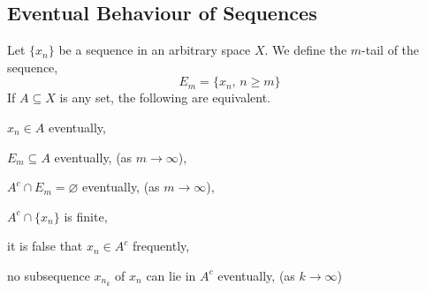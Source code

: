 \documentclass[../../main.tex]{subfiles}
\begin{document}
\providecommand{\xn}{\{x_n\}}
\subsection{Eventual Behaviour of Sequences}
\begin{wts}
    Let $\xn$ be a sequence in an arbitrary space $X$. We define the $m$-tail of the sequence, 
    \[
    E_m = \{x_n,\,n\geq m\}
    \]
    If $A\subseteq X$ is any set, the following are equivalent.
    \begin{enumalpha}
        \item $x_n\in A$ eventually,\label{claim a}
        \item $E_m\subseteq A$ eventually, (as $m\to\infty$),\label{claim b}
        \item $A^c\cap E_m=\varnothing$ eventually, (as $m\to\infty$),\label{claim c}
        \item $A^c\cap \{x_n\}$ is finite,\label{claim d}
        \item it is false that $x_n\in A^c$ frequently,\label{claim e}
        \item no subsequence $x_{n_k}$ of $x_n$ can lie in $A^c$ eventually, (as $k\to\infty$)\label{claim f}
    \end{enumalpha}
\end{wts}
\end{document}
